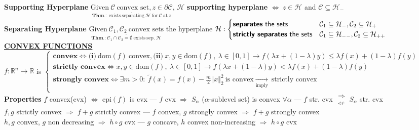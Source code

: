 \documentclass[a4paper]{article}
\begin{document}
\textbf{Supporting Hyperplane} $\underset{\overline{\textbf{Thm}.:\  \text{exists} \ \text{separating} \ \mathcal{H} \ \text{for} \ \mathcal{C}\ \text{at}\ z}}{\text{Given} \ \mathcal{C} \ \text{convex set}, z\in\partial\mathcal{C}}$, $\mathcal{H}$ \textbf{supporting hyperplane} $\iff \ z \in \mathcal{H}$ and $\mathcal{C} \subseteq \mathcal{H}_{-}$\\
\textbf{Separating Hyperplane} $\underset{\textbf{Thm.:}\ \mathcal{C}_1 \cap \mathcal{C}_2=\emptyset \ \text{exists} \ \text{sep.}\ \mathcal{H}}
{\underline{\text{Given}\ \mathcal{C}_1, \mathcal{C}_2 \ \text{convex sets}}}$ the hyperplane $\mathcal{H}: \begin{cases}
    \textsf{\textbf{separates} the sets}&\mathcal{C}_1 \subseteq \mathcal{H}_{-}, \mathcal{C}_2 \subseteq \mathcal{H}_+\\
    \textsf{\textbf{strictly separates} the sets}&\mathcal{C}_1 \subseteq \mathcal{H}_{--}, \mathcal{C}_2 \subseteq \mathcal{H}_{++}\\
\end{cases}$\\
\textbf{\underline{CONVEX FUNCTIONS}}\\
$f:\mathbb{R}^n \to \mathbb{R}$ is $\begin{cases}
\textbf{convex} \iff \textbf{(i)} \ \text{dom}(f) \ \text{convex}, \textbf{(ii)} \ x,y\in\text{dom}(f), \ \lambda \in [0,1]
\to f(\lambda{x}+(1-\lambda){y})\le\lambda{f(x)}+(1-\lambda)f(y)\\
\textbf{strictly convex} \iff  x,y\in\text{dom}(f), \ \lambda \in [0,1]
\to f(\lambda{x}+(1-\lambda){y})<\lambda{f(x)}+(1-\lambda)f(y)\\
\textbf{strongly convex}\iff \exists m >0: \ \tilde{f}(x)=f(x)-\frac{m}{2}\Vert{x}\Vert_2^2 \ \text{is convex} \underset{\text{imply}}{\to} \ \text{strictly convex}\\
\end{cases}$ \\
\textbf{Properties} $f$ convex(cvx) $\Leftrightarrow$ $\text{epi}(f)$ is cvx --- $f$ cvx $\Rightarrow$ $S_\alpha$ ($\alpha$-sublevel set) is convex $\forall \alpha$ ---
$f$ str. cvx $\substack{\Rightarrow\\\nLeftarrow} \ S_\alpha$ str. cvx\\
$f,g$ strictly convex $\Rightarrow$ $f+g$ strictly convex --- $f$ convex, $g$ strongly convex $\Rightarrow$ $f+g$ strongly convex\\
$h,g$ convex, $g$ non decreasing $\Rightarrow$ ${h}\circ{g}$ cvx --- $g$ concave, $h$ convex non-increasing $\Rightarrow$ ${h}\circ{g}$ cvx\\
\end{document}
